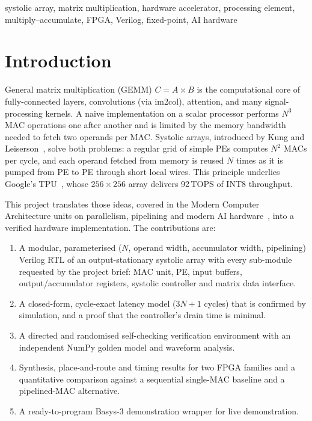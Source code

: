 \documentclass[conference]{IEEEtran}
\begin{document}
\begin{IEEEkeywords}
systolic array, matrix multiplication, hardware accelerator, processing
element, multiply--accumulate, FPGA, Verilog, fixed-point, AI hardware
\end{IEEEkeywords}

\section{Introduction}
General matrix multiplication (GEMM) $C = A\times B$ is the computational core
of fully-connected layers, convolutions (via im2col), attention, and many
signal-processing kernels. A naive implementation on a scalar processor
performs $N^3$ MAC operations one after another and is limited by the memory
bandwidth needed to fetch two operands per MAC. Systolic arrays, introduced by
Kung and Leiserson~\cite{kung1979systolic,kung1982why}, solve both problems:
a regular grid of simple PEs computes $N^2$ MACs per cycle, and each operand
fetched from memory is reused $N$ times as it is pumped from PE to PE through
short local wires. This principle underlies Google's TPU~\cite{jouppi2017tpu},
whose $256\times256$ array delivers 92\,TOPS of INT8 throughput.

This project translates those ideas, covered in the Modern Computer Architecture units on
parallelism, pipelining and modern AI hardware~\cite{hennessy2019ca}, into a
verified hardware implementation. The contributions are:
\begin{enumerate}\setlength{\itemsep}{1pt}
\item A modular, parameterised ($N$, operand width, accumulator width,
  pipelining) Verilog RTL of an output-stationary systolic array with every
  sub-module requested by the project brief: MAC unit, PE, input buffers,
  output/accumulator registers, systolic controller and matrix data interface.
\item A closed-form, cycle-exact latency model ($3N+1$ cycles) that is
  confirmed by simulation, and a proof that the controller's drain time is
  minimal.
\item A directed and randomised self-checking verification environment with
  an independent NumPy golden model and waveform analysis.
\item Synthesis, place-and-route and timing results for two FPGA families and a
  quantitative comparison against a sequential single-MAC baseline and a
  pipelined-MAC alternative.
\item A ready-to-program Basys-3 demonstration wrapper for live demonstration.
\end{enumerate}
\end{document}
